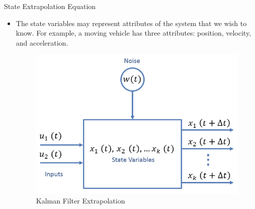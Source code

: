 \begin{frame}{State Extrapolation Equation}
\begin{itemize}
    \item The state variables may represent attributes of the system that we wish to know. For example, a moving vehicle has three attributes: position, velocity, and acceleration.
\begin{figure}
    \centering
    \includegraphics[width=0.5\linewidth]{Figures//Chapter2/KalmanFilterExtrapolation.png}
    \caption{Kalman Filter Extrapolation}
    \label{fig:KF_Extrapolation}
\end{figure}
\end{itemize}
\end{frame}
